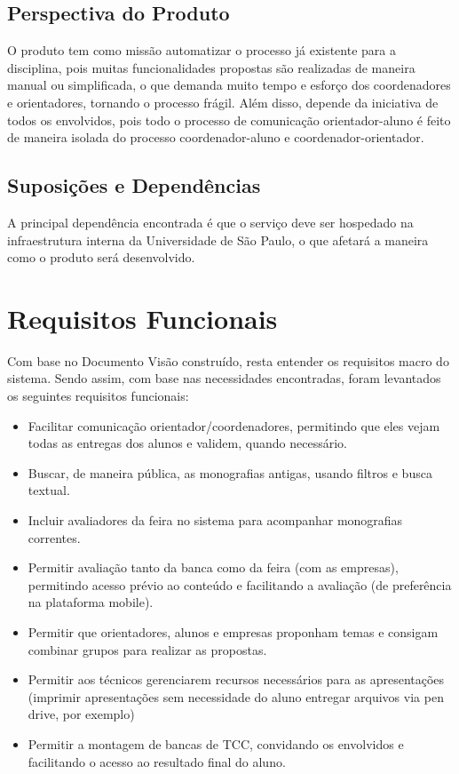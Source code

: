 \subsection{Perspectiva do Produto}
O produto tem como missão automatizar o processo já existente para a disciplina, pois muitas funcionalidades propostas são realizadas de maneira manual ou simplificada, o que demanda muito tempo e esforço dos coordenadores e orientadores, tornando o processo frágil. Além disso, depende da iniciativa de todos os envolvidos, pois todo o processo de comunicação orientador-aluno é feito de maneira isolada do processo coordenador-aluno e coordenador-orientador.

\subsection{Suposições e Dependências}
A principal dependência encontrada é que o serviço deve ser hospedado na infraestrutura interna da Universidade de São Paulo, o que afetará a maneira como o produto será desenvolvido.
  
\section{Requisitos Funcionais}
Com base no Documento Visão construído, resta entender os requisitos macro do sistema. Sendo assim, com base nas necessidades encontradas, foram levantados os seguintes requisitos funcionais:

\begin{itemize}
    \item Facilitar comunicação orientador/coordenadores, permitindo que eles vejam todas as entregas dos alunos e validem, quando necessário.
    \item Buscar, de maneira pública, as monografias antigas, usando filtros e busca textual.
    \item Incluir avaliadores da feira no sistema para acompanhar monografias correntes.
    \item Permitir avaliação tanto da banca como da feira (com as empresas), permitindo acesso prévio ao conteúdo e facilitando a avaliação (de preferência na plataforma mobile).
    \item Permitir que orientadores, alunos e empresas proponham temas e consigam combinar grupos para realizar as propostas.
    \item Permitir aos técnicos gerenciarem recursos necessários para as apresentações (imprimir apresentações sem necessidade do aluno entregar arquivos via pen drive, por exemplo)
    \item Permitir a montagem de bancas de TCC, convidando os envolvidos e facilitando o acesso ao resultado final do aluno.
\end{itemize}
  
